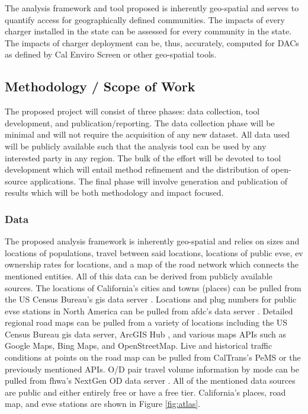 \documentclass[12pt]{article}
\begin{document}
The analysis framework and tool proposed is inherently geo-spatial and serves to quantify access for geographically defined communities. The impacts of every charger installed in the state can be assessed for every community in the state. The impacts of charger deployment can be, thus, accurately, computed for DACs as defined by Cal Enviro Screen or other geo-spatial tools.

\subsection*{Methodology / Scope of Work}

The proposed project will consist of three phases: data collection, tool development, and publication/reporting. The data collection phase will be minimal and will not require the acquisition of any new dataset. All data used will be publicly available such that the analysis tool can be used by any interested party in any region. The bulk of the effort will be devoted to tool development which will entail method refinement and the distribution of open-source applications. The final phase will involve generation and publication of results which will be both methodology and impact focused.

\subsubsection*{Data}

The proposed analysis framework is inherently geo-spatial and relies on sizes and locations of populations, travel between said locations, locations of public \gls{evse}, \gls{ev} ownership rates for locations, and a map of the road network which connects the mentioned entities. All of this data can be derived from publicly available sources. The locations of California's cities and towns (places) can be pulled from the US Census Bureau's \gls{gis} data server \cite{uscb_2023_doc, uscb_2023_files}. Locations and plug numbers for public \gls{evse} stations in North America can be pulled from \gls{afdc}'s data server \cite{afdc_2023}. Detailed regional road maps can be pulled from a variety of locations including the US Census Bureau \gls{gis} data server, ArcGIS Hub \cite{fhwa_2023}, and various maps APIs such as Google Maps, Bing Maps, and OpenStreetMap. Live and historical traffic conditions at points on the road map can be pulled from CalTrans's PeMS \cite{caltrans_2023} or the previously mentioned APIs. O/D pair travel volume information by mode can be pulled from \gls{fhwa}'s NextGen OD data server \cite{fhwa_2022}. All of the mentioned data sources are public and either entirely free or have a free tier. California's places, road map, and \gls{evse} stations are shown in Figure \ref{fig:atlas}.
\end{document}
